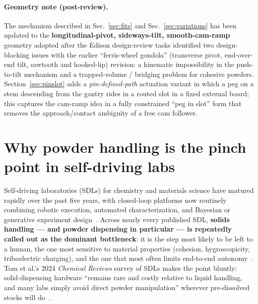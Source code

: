 \documentclass[11pt,a4paper]{article}
\begin{document}
\paragraph{Geometry note (post-review).}
The mechanism described in Sec.~\ref{sec:fits} and Sec.~\ref{sec:variations}
has been updated to the \textbf{longitudinal-pivot, sideways-tilt,
smooth-cam-ramp} geometry adopted after the Edison design-review tasks
identified two design-blocking issues with the earlier ``ferris-wheel
gondola'' (transverse pivot, end-over-end tilt, sawtooth and hooked-lip)
revision: a kinematic impossibility in the push-to-tilt mechanism and a
trapped-volume / bridging problem for cohesive powders. Section~\ref{sec:pinslot}
adds a \emph{pin-defined-path} actuation variant in which a peg on a stem
descending from the gantry rides in a routed slot in a fixed external board;
this captures the cam-ramp idea in a fully constrained ``peg in slot'' form
that removes the approach/contact ambiguity of a free cam follower.

\section{Why powder handling is the pinch point in self-driving labs}
\label{sec:why}

Self-driving laboratories (SDLs) for chemistry and materials science have
matured rapidly over the past five years, with closed-loop platforms now
routinely combining robotic execution, automated characterization, and
Bayesian or generative experiment design~\cite{tom2024selfdrivinglaboratoriesfor,szymanski2023anautonomouslaboratory,fei2024alabosapythonbased,mccalla2023semiautomatedexperimentsto}.
Across nearly every published SDL, \textbf{solids handling --- and powder
dispensing in particular --- is repeatedly called out as the dominant
bottleneck}: it is the step most likely to be left to a human, the one most
sensitive to material properties (cohesion, hygroscopicity, triboelectric
charging), and the one that most often limits end-to-end
autonomy~\cite{tom2024selfdrivinglaboratoriesfor,yang2007meteringanddispensing,carruthers2025amobilerobotic,jiang2023autonomousbiomimeticsolid}.
Tom et al.'s 2024 \emph{Chemical Reviews} survey of SDLs makes the point
bluntly: solid-dispensing hardware ``remains rare and costly relative to
liquid handling, and many labs simply avoid direct powder
manipulation'' wherever pre-dissolved stocks will
do~\cite{tom2024selfdrivinglaboratoriesfor}.
\end{document}
